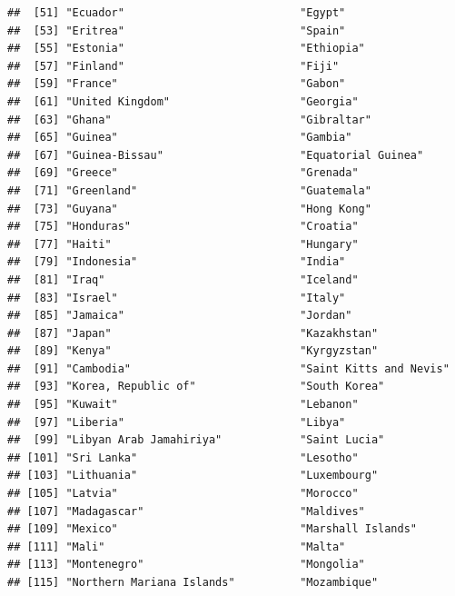 \documentclass[]{article}
\begin{document}
\begin{verbatim}
##  [51] "Ecuador"                           "Egypt"                            
##  [53] "Eritrea"                           "Spain"                            
##  [55] "Estonia"                           "Ethiopia"                         
##  [57] "Finland"                           "Fiji"                             
##  [59] "France"                            "Gabon"                            
##  [61] "United Kingdom"                    "Georgia"                          
##  [63] "Ghana"                             "Gibraltar"                        
##  [65] "Guinea"                            "Gambia"                           
##  [67] "Guinea-Bissau"                     "Equatorial Guinea"                
##  [69] "Greece"                            "Grenada"                          
##  [71] "Greenland"                         "Guatemala"                        
##  [73] "Guyana"                            "Hong Kong"                        
##  [75] "Honduras"                          "Croatia"                          
##  [77] "Haiti"                             "Hungary"                          
##  [79] "Indonesia"                         "India"                            
##  [81] "Iraq"                              "Iceland"                          
##  [83] "Israel"                            "Italy"                            
##  [85] "Jamaica"                           "Jordan"                           
##  [87] "Japan"                             "Kazakhstan"                       
##  [89] "Kenya"                             "Kyrgyzstan"                       
##  [91] "Cambodia"                          "Saint Kitts and Nevis"            
##  [93] "Korea, Republic of"                "South Korea"                      
##  [95] "Kuwait"                            "Lebanon"                          
##  [97] "Liberia"                           "Libya"                            
##  [99] "Libyan Arab Jamahiriya"            "Saint Lucia"                      
## [101] "Sri Lanka"                         "Lesotho"                          
## [103] "Lithuania"                         "Luxembourg"                       
## [105] "Latvia"                            "Morocco"                          
## [107] "Madagascar"                        "Maldives"                         
## [109] "Mexico"                            "Marshall Islands"                 
## [111] "Mali"                              "Malta"                            
## [113] "Montenegro"                        "Mongolia"                         
## [115] "Northern Mariana Islands"          "Mozambique"                       

\end{verbatim}
\end{document}
